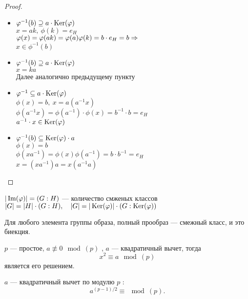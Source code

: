 \begin{proof}~
  \begin{itemize}
    \item
    $\varphi^{-1} (b) \supseteq a \cdot \operatorname{Ker} (\varphi)$ \\
    $x = ak, \ \phi(k) = e_H$ \\
    $\varphi (x) = \varphi(ak) = \varphi(a) \varphi(k) = b \cdot e_H = b \Rightarrow$ \\
    $x \in \phi ^{-1} (b)$
    \item 
    $\varphi^{-1} (b) \supseteq a \cdot \operatorname{Ker}(\varphi)$ \\
    $ x = ka$ \\
    Далее аналогично предыдущему пункту
    \item 
    $\varphi^{-1} \subseteq a \cdot \operatorname{Ker} (\varphi)$ \\
    $\phi(x) = b, \ x = a(a^{-1} x)$ \\
    $\phi(a^{-1} x) = \phi(a^{-1}) \cdot \phi(x) = b^{-1} \cdot b = e_H$ \\
    $a^{-1} \cdot x \in \operatorname{Ker} (\varphi)$
    \item
    $\varphi^{-1}(b) \subseteq \operatorname{Ker} (\varphi) \cdot a$ \\
    $\phi(x) = b$ \\
    $\phi(x a^{-1}) = \phi(x) \phi(a^{-1}) = b \cdot b^{-1} = e_H$ \\
    $x = (x a^{-1}) a = x(a^{-1}a)$
  \end{itemize}
\end{proof}

\begin{corollary}
  $|\operatorname{Im}(\varphi)| = (G : H)$ --- количество смженых классов \\
  $|G| = |H| \cdot (G : H), \quad |G| = |\operatorname{Ker} (\varphi)| \cdot (G : \operatorname{Ker} (\varphi))$
\end{corollary}

\begin{corollary}
  Для любого элемента группы образа, полный прообраз --- смежный класс, и это биекция.
\end{corollary}

\begin{proposition}
  $p$ --- простое, $a \not \equiv 0 \mod (p)$ , $a$ --- квадратичный вычет, тогда \\
  \[x^2 \equiv a \mod (p)\]
  является его решением.
\end{proposition}

\begin{lemma}
  $a$ --- квадратичный вычет по модулю $p$ : \\
  \[a^{(p-1)/2} \equiv \mod (p).\]
\end{lemma}


